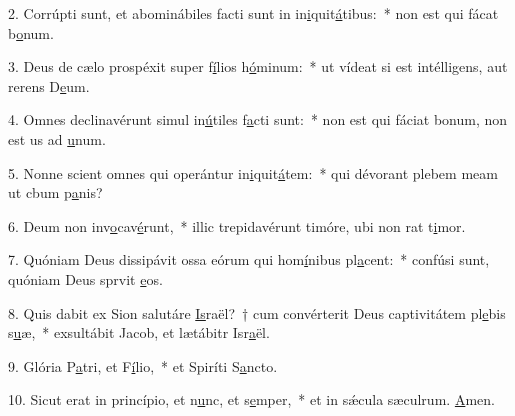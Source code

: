 2. Corrúpti sunt, et abominábiles facti sunt in in\uline{i}quit\uline{á}tibus:~* non est qui fácat b\uline{o}num.\par 
3. Deus de cælo prospéxit super f\uline{í}lios h\uline{ó}minum:~* ut vídeat si est intélligens, aut rerens D\uline{e}um.\par 
4. Omnes declinavérunt simul in\uline{ú}tiles f\uline{a}cti sunt:~* non est qui fáciat bonum, non est us ad \uline{u}num.\par 
5. Nonne scient omnes qui operántur in\uline{i}quit\uline{á}tem:~* qui dévorant plebem meam ut cbum p\uline{a}nis?\par 
6. Deum non inv\uline{o}cav\uline{é}runt,~* illic trepidavérunt timóre, ubi non rat t\uline{i}mor.\par 
7. Quóniam Deus dissipávit ossa eórum qui hom\uline{í}nibus pl\uline{a}cent:~* confúsi sunt, quóniam Deus sprvit \uline{e}os.\par 
8. Quis dabit ex Sion salutáre \uline{Is}raël?~† cum convérterit Deus captivitátem pl\uline{e}bis s\uline{u}æ,~* exsultábit Jacob, et lætábitr Isr\uline{a}ël.\par 
9. Glória P\uline{a}tri, et F\uline{í}lio,~* et Spiríti S\uline{a}ncto.\par 
10. Sicut erat in princípio, et n\uline{u}nc, et s\uline{e}mper,~* et in sǽcula sæculrum. \uline{A}men.\par 
